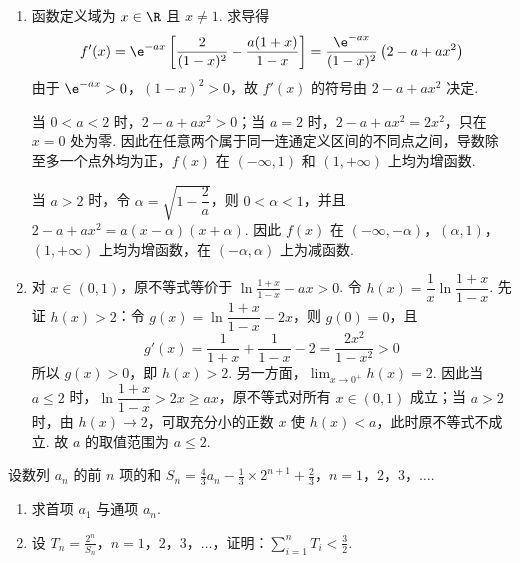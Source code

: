 \begin{solution}
\begin{enumerate}
\item 函数定义域为 \(x\in\R\) 且 \(x\ne1\). 求导得
\[
f'(x)=\e^{-ax}\left[\frac2{(1-x)^2}-\frac{a(1+x)}{1-x}\right]=\frac{\e^{-ax}}{(1-x)^2}\left(2-a+ax^2\right)
\]
由于 \(\e^{-ax}>0\)，\((1-x)^2>0\)，故 \(f'(x)\) 的符号由 \(2-a+ax^2\) 决定.

当 \(0<a<2\) 时，\(2-a+ax^2>0\)；当 \(a=2\) 时，\(2-a+ax^2=2x^2\)，只在 \(x=0\) 处为零. 因此在任意两个属于同一连通定义区间的不同点之间，导数除至多一个点外均为正，\(f(x)\) 在 \((-\infty,1)\) 和 \((1,+\infty)\) 上均为增函数.

当 \(a>2\) 时，令 \(\alpha=\sqrt{1-\dfrac2a}\)，则 \(0<\alpha<1\)，并且
\(2-a+ax^2=a(x-\alpha)(x+\alpha)\). 因此 \(f(x)\) 在 \((-\infty,-\alpha)\)，\((\alpha,1)\)，\((1,+\infty)\) 上均为增函数，在 \((-\alpha,\alpha)\) 上为减函数.
\item 对 \(x\in(0,1)\)，原不等式等价于 \(\ln\frac{1+x}{1-x}-ax>0\).
令 \(h(x)=\dfrac1x\ln\dfrac{1+x}{1-x}\). 先证 \(h(x)>2\)：令 \(g(x)=\ln\dfrac{1+x}{1-x}-2x\)，则 \(g(0)=0\)，且
\[
g'(x)=\frac1{1+x}+\frac1{1-x}-2=\frac{2x^2}{1-x^2}>0
\]
所以 \(g(x)>0\)，即 \(h(x)>2\). 另一方面，\(\displaystyle\lim_{x\to0^+}h(x)=2\). 因此当 \(a\leq2\) 时，\(\ln\dfrac{1+x}{1-x}>2x\geq ax\)，原不等式对所有 \(x\in(0,1)\) 成立；当 \(a>2\) 时，由 \(h(x)\to2\)，可取充分小的正数 \(x\) 使 \(h(x)<a\)，此时原不等式不成立. 故 \(a\) 的取值范围为 \(a\leq2\).
\end{enumerate}
\end{solution}

\begin{problem}
设数列 \(a_n\) 的前 \(n\) 项的和 \(S_n=\frac43a_n-\frac13\times2^{n+1}+\frac23\)，\(n=1\)，\(2\)，\(3\)，\(\ldots\).

\begin{enumerate}
\item 求首项 \(a_1\) 与通项 \(a_n\).
\item 设 \(T_n=\frac{2^n}{S_n}\)，\(n=1\)，\(2\)，\(3\)，\(\ldots\)，证明：\(\sum_{i=1}^nT_i<\frac32\).
\end{enumerate}
\end{problem}

